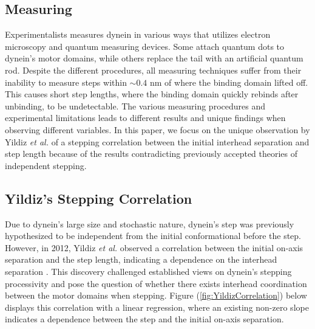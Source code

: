 \subsection{Measuring}

Experimentalists measures dynein in various ways that utilizes electron microscopy and quantum measuring devices. Some attach quantum dots to dynein's motor domains, while others replace the tail with an artificial quantum rod. Despite the different procedures, all measuring techniques suffer from their inability to measure steps within $\sim 0.4$ nm of where the binding domain lifted off. This causes short step lengths, where the binding domain quickly rebinds after unbinding, to be undetectable. The various measuring procedures and experimental limitations leads to different results and unique findings when observing different variables. In this paper, we focus on the unique observation by Yildiz \textit{et al.} of a stepping correlation between the initial interhead separation and step length because of the results contradicting previously accepted theories of independent stepping. 


\subsection{Yildiz's Stepping Correlation}

Due to dynein's large size and stochastic nature, dynein's step was previously hypothesized to be independent from the initial conformational before the step. However, in 2012, Yildiz \textit{et al.} observed a correlation between the initial on-axis separation and the step length, indicating a dependence on the interhead separation \cite{Dewitt2012}. This discovery challenged established views on dynein's stepping processivity and pose the question of whether there exists interhead coordination between the motor domains when stepping. Figure (\ref{fig:YildizCorrelation}) below displays this correlation with a linear regression, where an existing non-zero slope indicates a dependence between the step and the initial on-axis separation.


